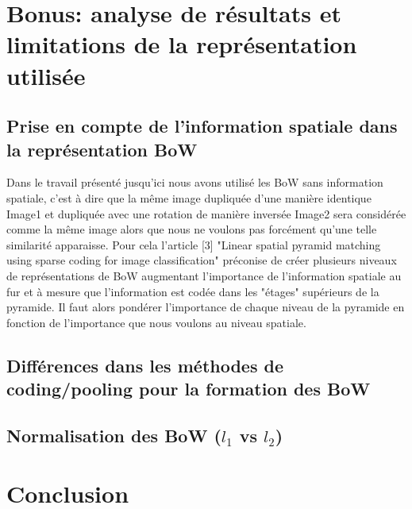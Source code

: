 \documentclass[a4paper]{article}
\begin{document}
\section{Bonus: analyse de résultats et limitations de la représentation utilisée}
\subsection{Prise en compte de l'information spatiale dans la représentation BoW}
Dans le travail présenté jusqu'ici nous avons utilisé les BoW sans information spatiale, c'est à dire que la même image dupliquée d'une manière identique Image1 et dupliquée avec une rotation de manière inversée Image2 sera considérée comme la même image alors que nous ne voulons pas forcément qu'une telle similarité apparaisse. Pour cela l'article [3] "Linear spatial pyramid matching using sparse coding for image classification" préconise de créer plusieurs niveaux de représentations de BoW augmentant l'importance de l'information spatiale au fur et à mesure que l'information est codée dans les "étages" supérieurs de la pyramide. Il faut alors pondérer l'importance de chaque niveau de la pyramide en fonction de l'importance que nous voulons au niveau spatiale. 
\subsection{Différences dans les méthodes de coding/pooling pour la formation des BoW}

\subsection{Normalisation des BoW ($l_1$ vs  $l_2$)}
\section{Conclusion}
\end{document}

